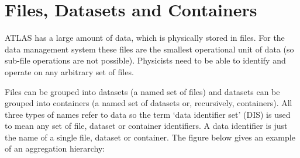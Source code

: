 \documentclass{atlasnote}
\begin{document}
{\hfill{}\hfill}

\newpage

\section{Files, Datasets and Containers}
\label{overview_Dataset::doc}\label{overview_Dataset:dataset}

ATLAS has a large amount of data, which is physically stored in files. For the data management system these files are the smallest operational unit of data (so sub-file operations are not possible). Physicists need to be able to identify and operate on any arbitrary set of files.

Files can be grouped into datasets (a named set of files) and datasets can be grouped into containers (a named set of datasets or, recursively, containers). All three types of names refer to data so the term ‘data identifier set’ (DIS) is used to mean any set of file, dataset or container identifiers. A data identifier is just the name of a single file, dataset or container. The figure below gives an example of an aggregation hierarchy:
\end{document}

